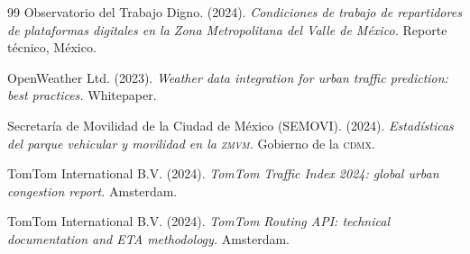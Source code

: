 \documentclass[11pt,a4paper]{article}
\newcommand{\ZMVM}{\textsc{zmvm}}
\newcommand{\CDMX}{\textsc{cdmx}}
\begin{document}
\begin{thebibliography}{99}
Observatorio del Trabajo Digno. (2024).
\emph{Condiciones de trabajo de repartidores de plataformas
digitales en la Zona Metropolitana del Valle de México.}
Reporte técnico, México.

OpenWeather Ltd. (2023). \emph{Weather data integration for
urban traffic prediction: best practices.} Whitepaper.

Secretaría de Movilidad de la Ciudad de México (SEMOVI). (2024).
\emph{Estadísticas del parque vehicular y movilidad en la
\ZMVM.} Gobierno de la \CDMX.

TomTom International B.V. (2024).
\emph{TomTom Traffic Index 2024: global urban congestion
report.} Amsterdam.

TomTom International B.V. (2024).
\emph{TomTom Routing API: technical documentation and ETA
methodology.} Amsterdam.

\end{thebibliography}
\end{document}
